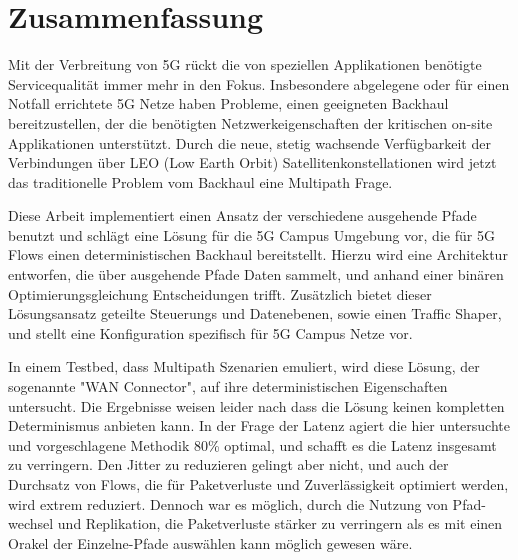 \section*{Zusammenfassung}

Mit der Verbreitung von 5G rückt die von speziellen Applikationen benötigte Servicequalität immer mehr in den Fokus. Insbesondere abgelegene oder für einen Notfall errichtete 5G Netze haben Probleme, einen geeigneten Backhaul bereitzustellen, der die benötigten Netzwerkeigenschaften der kritischen on-site Applikationen unterstützt. Durch die neue, stetig wachsende Verfügbarkeit der Verbindungen über LEO (Low Earth Orbit) Satellitenkonstellationen wird jetzt das traditionelle Problem vom Backhaul eine Multipath Frage.

Diese Arbeit implementiert einen Ansatz der verschiedene ausgehende Pfade benutzt und schlägt eine Lösung für die 5G Campus Umgebung vor, die für 5G Flows einen deterministischen Backhaul bereitstellt. Hierzu wird eine Architektur entworfen, die über ausgehende Pfade Daten sammelt, und anhand einer binären Optimierungsgleichung Entscheidungen trifft. Zusätzlich bietet dieser Lösungsansatz geteilte Steuerungs und Datenebenen, sowie einen Traffic Shaper, und stellt eine Konfiguration spezifisch für 5G Campus Netze vor.

In einem Testbed, dass Multipath Szenarien emuliert, wird diese Lösung, der sogenannte "WAN Connector", auf ihre deterministischen Eigenschaften untersucht. Die Ergebnisse weisen leider nach dass die Lösung keinen kompletten Determinismus anbieten kann. In der Frage der Latenz agiert die hier untersuchte und vorgeschlagene Methodik 80\% optimal, und schafft es die Latenz insgesamt zu verringern. Den Jitter zu reduzieren gelingt aber nicht, und auch der Durchsatz von Flows, die für Paketverluste und Zuverlässigkeit optimiert werden, wird extrem reduziert. Dennoch war es möglich, durch die Nutzung von Pfad-wechsel und Replikation, die Paketverluste stärker zu verringern als es mit einen Orakel der Einzelne-Pfade auswählen kann möglich gewesen wäre.